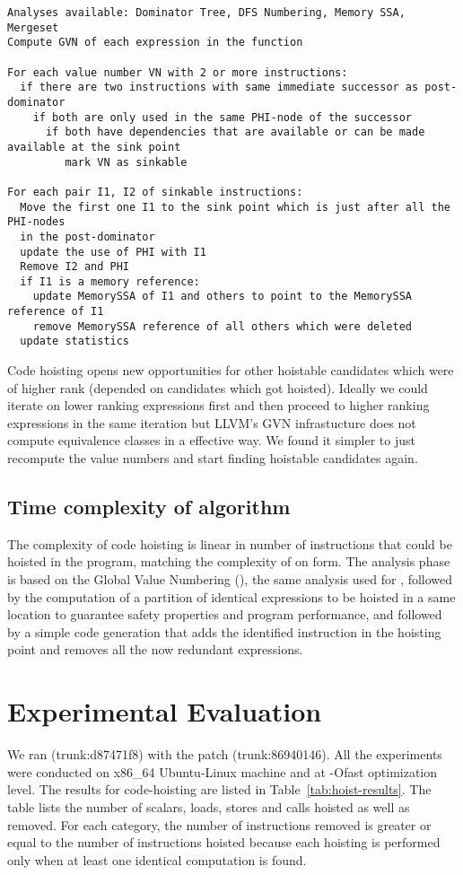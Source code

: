 \documentclass[acmlarge,review]{acmart}\settopmatter{printfolios=true}
\begin{document}
\begin{verbatim}
Analyses available: Dominator Tree, DFS Numbering, Memory SSA, Mergeset
Compute GVN of each expression in the function

For each value number VN with 2 or more instructions:
  if there are two instructions with same immediate successor as post-dominator
    if both are only used in the same PHI-node of the successor
      if both have dependencies that are available or can be made available at the sink point
         mark VN as sinkable

For each pair I1, I2 of sinkable instructions:
  Move the first one I1 to the sink point which is just after all the PHI-nodes
  in the post-dominator
  update the use of PHI with I1
  Remove I2 and PHI
  if I1 is a memory reference:
    update MemorySSA of I1 and others to point to the MemorySSA reference of I1
    remove MemorySSA reference of all others which were deleted
  update statistics

\end{verbatim}

Code hoisting opens new opportunities for other hoistable candidates which were
of higher rank (depended on candidates which got hoisted). Ideally we could
iterate on lower ranking expressions first and then proceed to higher ranking
expressions in the same iteration but LLVM's GVN infrastucture does not compute
equivalence classes in a effective way. We found it simpler to just recompute
the value numbers and start finding hoistable candidates again.

\subsection{Time complexity of algorithm}
The complexity of code hoisting is linear in number of instructions that could
be hoisted in the program, matching the complexity of \PRE{} on \SSA{} form.  The
analysis phase is based on the Global Value Numbering (\GVN{}), the same analysis
used for \PRE{}, followed by the computation of a partition of identical
expressions to be hoisted in a same location to guarantee safety properties and
program performance, and followed by a simple code generation that adds the
identified instruction in the hoisting point and removes all the now redundant
expressions.


\section{Experimental Evaluation}
\label{sec:experimental-results}
We ran \LLVMTestSuite{} (trunk:d87471f8) with the patch (trunk:86940146). All
the experiments were conducted on x86\_64 Ubuntu-Linux machine and at -Ofast
optimization level.  The results for code-hoisting are listed in
Table~\ref{tab:hoist-results}. The table lists the number of scalars, loads,
stores and calls hoisted as well as removed. For each category, the number of
instructions removed is greater or equal to the number of instructions hoisted
because each hoisting is performed only when at least one identical computation
is found.
\end{document}

